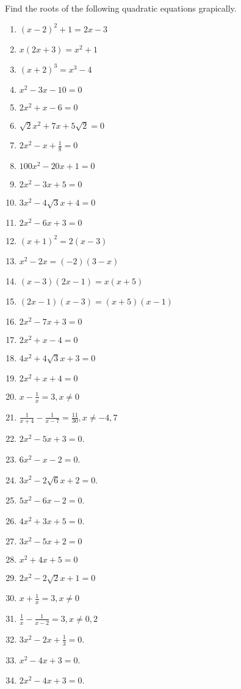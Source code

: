 Find the roots of the following quadratic  equations grapically.
 \begin{multicols}{2}
\begin{enumerate}[label=\thesubsection.\arabic*,ref=\thesubsection.\theenumi, itemsep=1ex]
\item $(x-2)^2+1=2x-3$
\item $x(2x+3) = x^2+1$
\item $(x+2)^3 = x^3-4$
\item $x^2-3x-10=0$
\item $2x^2+x-6=0$
\item $ \sqrt 2x^2+7x+5 \sqrt 2=0$
\item $2x^2-x+\frac{1}{8}=0$
\item $100x^2-20x+1=0$
\item $2x^2-3x+5=0$
\item $3x^2-4 \sqrt 3x+4=0$
\item $2x^2-6x+3=0$
\item $(x+1)^2=2(x-3)$
\item $x^2-2x=(-2)(3-x)$
\item $(x-3)(2x-1)=x(x+5)$
\item $(2x-1)(x-3)=(x+5)(x-1)$
\item
$2x^2-7x+3=0$
\item
$2x^2+x-4=0$
\item
$4x^2+4\sqrt 3x+3=0$
\item
$2x^2+x+4=0$
\item
$x-\frac{1}{x}=3, x\neq{0}$
\item
$\frac{1}{x+4}-\frac{1}{x-7}=\frac{11}{30}, x\neq{-4,7}$
\item $2x^2 -5x+3 = 0$.
\item $6x^2 -x-2 = 0$.
\item $3x^2 -2\sqrt6x+2 = 0$.
\item $5x^2-6x-2 = 0$. 
\item $4x^2+3x+5 = 0$. 
\item $3x^2-5x+2 = 0$
\item $x^2+4x+5 = 0$
\item $2x^2-2\sqrt 2x+1 = 0$
\item $x+\frac{1}{x} = 3,x\neq0$
\item $\frac{1}{x}-\frac{1}{x-2} = 3, x\neq 0,2$
\item $3x^2-2x+\frac{1}{3} = 0$. 
\item $x^2-4x+3 = 0$.
\item $2x^2-4x+3 = 0$.
\end{enumerate}
\end{multicols}
